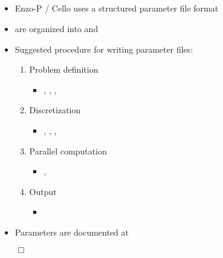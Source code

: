 \NEWSEC

\subsection{\ssParametersSummary}


\begin{frame}[fragile,label=ss-parameters-summary] 
\secframetitle{\ssParametersSummary}
\begin{itemize}
\item Enzo-P / Cello uses a structured parameter file format
\item {} are organized into  and 
\item Suggested procedure for writing parameter files:
\begin{enumerate}
\item Problem definition
\begin{itemize}
\item {}, , , 
\end{itemize}
\item Discretization
\begin{itemize}
\item {}, , , 
\end{itemize}
\item Parallel computation
\begin{itemize}
\item {}, 
\end{itemize}
\item Output
\begin{itemize}
\item {}
\end{itemize}
\end{enumerate}
\item Parameters are documented at \\ 
\end{itemize}
\vfill
\centerline{$\qed$}
\end{frame}

